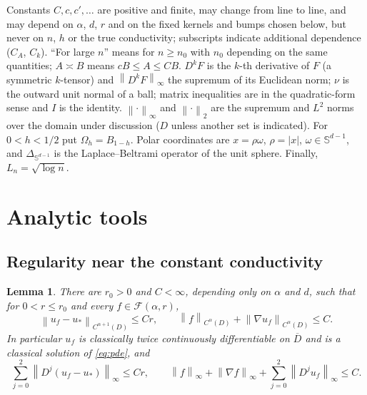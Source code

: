 \documentclass[12pt]{article}
\numberwithin{equation}{section}
\newtheorem{lemma}[theorem]{Lemma}
\newcommand{\norm}[1]{\left\|#1\right\|}
\newcommand{\Sp}{\mathbb S^{d-1}}
\begin{document}
Constants $C,c,c',\dots$ are positive and finite, may change from line
to line, and may depend on $\alpha$, $d$, $r$ and on the fixed kernels
and bumps chosen below, but never on $n$, $h$ or the true conductivity;
subscripts indicate additional dependence ($C_A$, $C_k$). ``For large
$n$'' means for $n\ge n_0$ with $n_0$ depending on the same quantities;
$A\asymp B$ means $cB\le A\le CB$. $D^kF$ is the $k$-th derivative of
$F$ (a symmetric $k$-tensor) and $\norm{D^kF}_\infty$ the supremum of
its Euclidean norm; $\nu$ is the outward unit normal of a ball; matrix
inequalities are in the quadratic-form sense and $I$ is the identity.
$\norm\cdot_\infty$ and $\norm\cdot_2$ are the supremum and $L^2$
norms over the domain under discussion ($D$ unless another set is
indicated). For $0<h<1/2$ put $\Omega_h=B_{1-h}$. Polar coordinates
are $x=\rho\omega$, $\rho=|x|$, $\omega\in\Sp$, and $\Delta_{\Sp}$ is
the Laplace--Beltrami operator of the unit sphere. Finally,
$L_n=\sqrt{\log n}$.

\section{Analytic tools}\label{sec:tools}

\subsection{Regularity near the constant conductivity}

\begin{lemma}\label{lem:regularity}
There are $r_0>0$ and $C<\infty$, depending only on $\alpha$ and $d$,
such that for $0<r\le r_0$ and every $f\in\mathcal F(\alpha,r)$,
\begin{equation}\label{eq:regularity}
 \norm{u_f-u_*}_{C^{\alpha+1}(D)}\le Cr,\qquad
 \norm{f}_{C^\alpha(D)}+\norm{\nabla u_f}_{C^\alpha(D)}\le C.
\end{equation}
In particular $u_f$ is classically twice continuously differentiable
on $\overline D$ and is a classical solution of \eqref{eq:pde}, and
\begin{equation}\label{eq:classical}
 \sum_{j=0}^2\norm{D^j(u_f-u_*)}_\infty\le Cr,\qquad
 \norm f_\infty+\norm{\nabla f}_\infty
 +\sum_{j=0}^{2}\norm{D^ju_f}_\infty\le C.
\end{equation}
\end{lemma}
\end{document}

